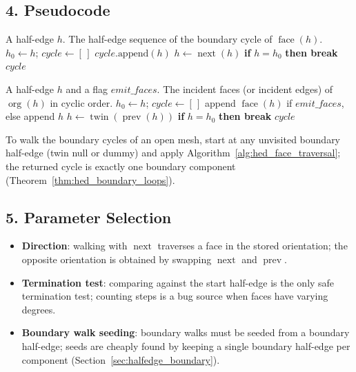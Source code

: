 \subsection{4. Pseudocode}

\begin{algorithm}[htbp]
\caption{Walk a Face Boundary}
\label{alg:hed_face_traversal}
\begin{algorithmic}[1]
\Require A half-edge $h$.
\Ensure The half-edge sequence of the boundary cycle of $\operatorname{face}(h)$.
  \State $h_0 \gets h$; $\mathit{cycle} \gets [\,]$
  \Loop
    \State $\mathit{cycle}.\text{append}(h)$
    \State $h \gets \operatorname{next}(h)$
    \State \textbf{if} $h = h_0$ \textbf{then break}
  \EndLoop
  \State \Return $\mathit{cycle}$
\EndFunction
\end{algorithmic}
\end{algorithm}

\begin{algorithm}[htbp]
\caption{Walk Around a Vertex}
\label{alg:hed_vertex_traversal}
\begin{algorithmic}[1]
\Require A half-edge $h$ and a flag $\mathit{emit\_faces}$.
\Ensure The incident faces (or incident edges) of $\operatorname{org}(h)$ in cyclic order.
  \State $h_0 \gets h$; $\mathit{cycle} \gets [\,]$
  \Loop
    \State append $\operatorname{face}(h)$ if $\mathit{emit\_faces}$, else append $h$
    \State $h \gets \operatorname{twin}(\operatorname{prev}(h))$
    \State \textbf{if} $h = h_0$ \textbf{then break}
  \EndLoop
  \State \Return $\mathit{cycle}$
\EndFunction
\end{algorithmic}
\end{algorithm}

\begin{remark}
To walk the boundary cycles of an open mesh, start at any unvisited
boundary half-edge (twin null or dummy) and apply
Algorithm~\ref{alg:hed_face_traversal}; the returned cycle is exactly one
boundary component (Theorem~\ref{thm:hed_boundary_loops}).
\end{remark}

\subsection{5. Parameter Selection}

\begin{itemize}
  \item \textbf{Direction}: walking with $\operatorname{next}$ traverses a
    face in the stored orientation; the opposite orientation is obtained by
    swapping $\operatorname{next}$ and $\operatorname{prev}$.
  \item \textbf{Termination test}: comparing against the start half-edge is
    the only safe termination test; counting steps is a bug source when
    faces have varying degrees.
  \item \textbf{Boundary walk seeding}: boundary walks must be seeded from
    a boundary half-edge; seeds are cheaply found by keeping a single
    boundary half-edge per component (Section~\ref{sec:halfedge_boundary}).
\end{itemize}

